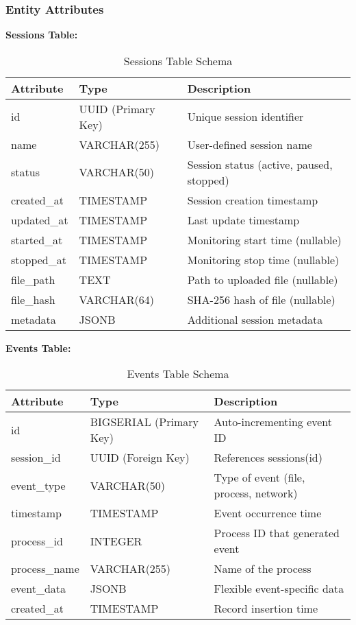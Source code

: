 \subsubsection{Entity Attributes}

\textbf{Sessions Table:}
\begin{table}[h]
\centering
\small
\begin{tabular}{|l|l|l|}
\hline
\textbf{Attribute} & \textbf{Type} & \textbf{Description} \\
\hline
id & UUID (Primary Key) & Unique session identifier \\
name & VARCHAR(255) & User-defined session name \\
status & VARCHAR(50) & Session status (active, paused, stopped) \\
created\_at & TIMESTAMP & Session creation timestamp \\
updated\_at & TIMESTAMP & Last update timestamp \\
started\_at & TIMESTAMP & Monitoring start time (nullable) \\
stopped\_at & TIMESTAMP & Monitoring stop time (nullable) \\
file\_path & TEXT & Path to uploaded file (nullable) \\
file\_hash & VARCHAR(64) & SHA-256 hash of file (nullable) \\
metadata & JSONB & Additional session metadata \\
\hline
\end{tabular}
\caption{Sessions Table Schema}
\end{table}

\textbf{Events Table:}
\begin{table}[h]
\centering
\small
\begin{tabular}{|l|l|l|}
\hline
\textbf{Attribute} & \textbf{Type} & \textbf{Description} \\
\hline
id & BIGSERIAL (Primary Key) & Auto-incrementing event ID \\
session\_id & UUID (Foreign Key) & References sessions(id) \\
event\_type & VARCHAR(50) & Type of event (file, process, network) \\
timestamp & TIMESTAMP & Event occurrence time \\
process\_id & INTEGER & Process ID that generated event \\
process\_name & VARCHAR(255) & Name of the process \\
event\_data & JSONB & Flexible event-specific data \\
created\_at & TIMESTAMP & Record insertion time \\
\hline
\end{tabular}
\caption{Events Table Schema}
\end{table}

